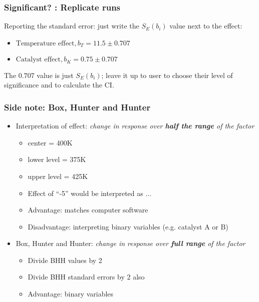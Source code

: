 \begin{frame}\frametitle{Significant? : Replicate runs}

	Reporting the standard error: just write the $S_E(b_i)$ value next to the effect:
	\begin{itemize}
		\item	$\text{Temperature effect}, b_T = 11.5 \pm 0.707$
		\item	$\text{Catalyst effect}, b_K = 0.75 \pm 0.707$
	\end{itemize}

	The $0.707$ value is just $S_E(b_i)$; leave it up to user to choose their level of significance and to calculate the CI.
\end{frame}

\begin{frame}\frametitle{Side note: Box, Hunter and Hunter}
	\begin{itemize}
		\item	Interpretation of effect: \emph{change in response over \textbf{half the range} of the factor}
		\begin{itemize}
			\item	center = 400K
			\item	lower level = 375K
			\item	upper level = 425K
			\item	Effect of ``-5'' would be interpreted as ...
			\item	Advantage: matches computer software
			\item	Disadvantage: interpreting binary variables (e.g. catalyst A or B)
		\end{itemize}
	\end{itemize}
	\begin{itemize}
		\item	Box, Hunter and Hunter: \emph{change in response over \textbf{full range} of the factor}
		\begin{itemize}
			\item	Divide BHH values by 2
			\item	Divide BHH standard errors by 2 also
			\item	Advantage: binary variables
		\end{itemize}
	\end{itemize}
\end{frame}

